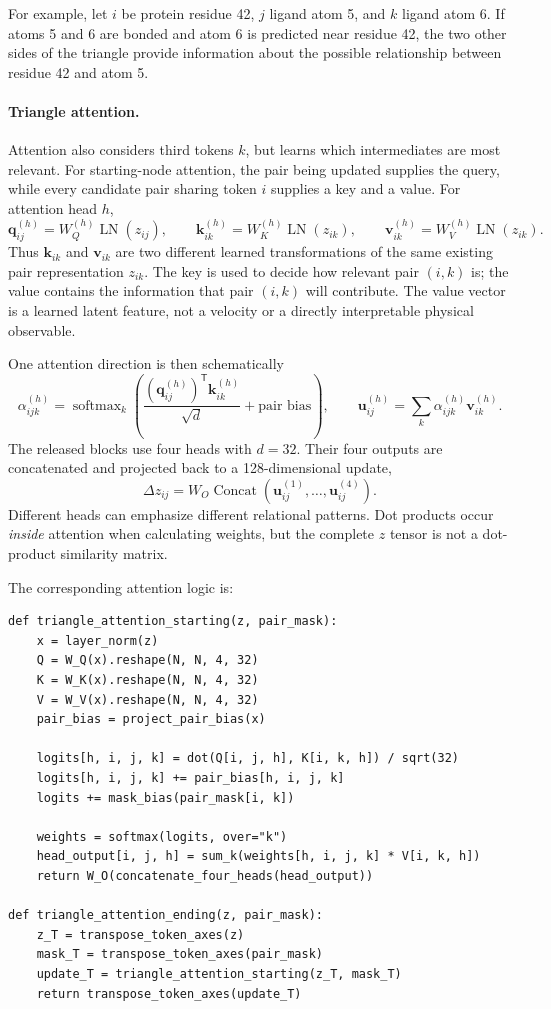 \documentclass[11pt]{article}
\begin{document}
For example, let $i$ be protein residue 42, $j$ ligand atom 5, and $k$ ligand
atom 6. If atoms 5 and 6 are bonded and atom 6 is predicted near residue 42,
the two other sides of the triangle provide information about the possible
relationship between residue 42 and atom 5.

\paragraph{Triangle attention.}
Attention also considers third tokens $k$, but learns which intermediates are
most relevant. For starting-node attention, the pair being updated supplies the
query, while every candidate pair sharing token $i$ supplies a key and a value.
For attention head $h$,
\[
  \mathbf q_{ij}^{(h)}
  =W_Q^{(h)}\operatorname{LN}(z_{ij}),
  \qquad
  \mathbf k_{ik}^{(h)}
  =W_K^{(h)}\operatorname{LN}(z_{ik}),
  \qquad
  \mathbf v_{ik}^{(h)}
  =W_V^{(h)}\operatorname{LN}(z_{ik}).
\]
Thus $\mathbf k_{ik}$ and $\mathbf v_{ik}$ are two different learned
transformations of the same existing pair representation $z_{ik}$. The key is
used to decide how relevant pair $(i,k)$ is; the value contains the information
that pair $(i,k)$ will contribute. The value vector is a learned latent feature,
not a velocity or a directly interpretable physical observable.

One attention direction is then schematically
\[
  \alpha_{ijk}^{(h)}
  =\operatorname{softmax}_k\!\left(
    \frac{(\mathbf q_{ij}^{(h)})^{\mathsf T}\mathbf k_{ik}^{(h)}}{\sqrt d}
    +\text{pair bias}
  \right),
  \qquad
  \mathbf u_{ij}^{(h)}
  =\sum_k\alpha_{ijk}^{(h)}\mathbf v_{ik}^{(h)}.
\]
The released blocks use four heads with $d=32$. Their four outputs are
concatenated and projected back to a 128-dimensional update,
\[
  \Delta z_{ij}
  =W_O\operatorname{Concat}\!\left(
    \mathbf u_{ij}^{(1)},\ldots,\mathbf u_{ij}^{(4)}
  \right).
\]
Different heads can emphasize different relational patterns. Dot products occur
\emph{inside} attention when calculating weights, but the complete $z$ tensor
is not a dot-product similarity matrix.

The corresponding attention logic is:
\begin{verbatim}
def triangle_attention_starting(z, pair_mask):
    x = layer_norm(z)
    Q = W_Q(x).reshape(N, N, 4, 32)
    K = W_K(x).reshape(N, N, 4, 32)
    V = W_V(x).reshape(N, N, 4, 32)
    pair_bias = project_pair_bias(x)

    logits[h, i, j, k] = dot(Q[i, j, h], K[i, k, h]) / sqrt(32)
    logits[h, i, j, k] += pair_bias[h, i, j, k]
    logits += mask_bias(pair_mask[i, k])

    weights = softmax(logits, over="k")
    head_output[i, j, h] = sum_k(weights[h, i, j, k] * V[i, k, h])
    return W_O(concatenate_four_heads(head_output))

def triangle_attention_ending(z, pair_mask):
    z_T = transpose_token_axes(z)
    mask_T = transpose_token_axes(pair_mask)
    update_T = triangle_attention_starting(z_T, mask_T)
    return transpose_token_axes(update_T)
\end{verbatim}
\end{document}
